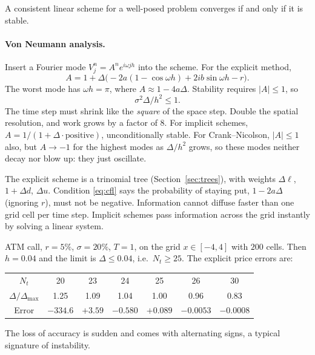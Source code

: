 \begin{theorem}
A consistent linear scheme for a well-posed problem converges if and only if it is stable.
\end{theorem}

\paragraph{Von Neumann analysis.} Insert a Fourier mode $V_j^n=A^ne^{i\omega jh}$ into the scheme. For the explicit method,
\[
A=1+\Delta\bigl(-2a(1-\cos\omega h)+2ib\sin\omega h-r\bigr).
\]
The worst mode has $\omega h=\pi$, where $A\approx1-4a\Delta$. Stability requires $|A|\le1$, so
\begin{equation}\label{eq:cfl}
\sigma^2\Delta/h^2\le1.
\end{equation}
The time step must shrink like the \emph{square} of the space step. Double the spatial resolution, and work grows by a factor of $8$. For implicit schemes, $A=1/(1+\Delta\cdot\text{positive})$, unconditionally stable. For Crank--Nicolson, $|A|\le1$ also, but $A\to-1$ for the highest modes as $\Delta/h^2$ grows, so these modes neither decay nor blow up: they just oscillate.

\begin{intuition}
The explicit scheme is a trinomial tree (Section~\ref{sec:trees}), with weights $\Delta\ell$, $1+\Delta d$, $\Delta u$. Condition \eqref{eq:cfl} says the probability of staying put, $1-2a\Delta$ (ignoring $r$), must not be negative. Information cannot diffuse faster than one grid cell per time step. Implicit schemes pass information across the grid instantly by solving a linear system.
\end{intuition}

\begin{numcheck}
ATM call, $r=5\%$, $\sigma=20\%$, $T=1$, on the grid $x\in[-4,4]$ with $200$ cells. Then $h=0.04$ and the limit is $\Delta\le0.04$, i.e.\ $N_t\ge25$. The explicit price errors are:
\begin{center}
\begin{tabular}{ccccccc}
\toprule
$N_t$ & 20 & 23 & 24 & 25 & 26 & 30\\
$\Delta/\Delta_{\max}$ & 1.25 & 1.09 & 1.04 & 1.00 & 0.96 & 0.83\\
\midrule
Error & $-334.6$ & $+3.59$ & $-0.580$ & $+0.089$ & $-0.0053$ & $-0.0008$\\
\bottomrule
\end{tabular}
\end{center}
The loss of accuracy is sudden and comes with alternating signs, a typical signature of instability.
\end{numcheck}

